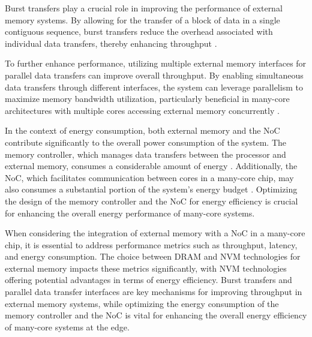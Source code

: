 Burst transfers play a crucial role in improving the performance of external memory systems.
By allowing for the transfer of a block of data in a single contiguous sequence, burst transfers reduce the overhead associated with individual data transfers, thereby enhancing throughput \cite{bakhodaDesigningOnchipNetworks2013}.

To further enhance performance, utilizing multiple external memory interfaces for parallel data transfers can improve overall throughput.
By enabling simultaneous data transfers through different interfaces, the system can leverage parallelism to maximize memory bandwidth utilization, particularly beneficial in many-core architectures with multiple cores accessing external memory concurrently \cite{chenIncreasingOffchipBandwidth2014}.

In the context of energy consumption, both external memory and the NoC contribute significantly to the overall power consumption of the system.
The memory controller, which manages data transfers between the processor and external memory, consumes a considerable amount of energy \cite{udipiRethinkingDRAMDesign2010}.
Additionally, the NoC, which facilitates communication between cores in a many-core chip, may also consumes a substantial portion of the system's energy budget \cite{ziaHighlyscalable3DCLOS2010}.
Optimizing the design of the memory controller and the NoC for energy efficiency is crucial for enhancing the overall energy performance of many-core systems.

When considering the integration of external memory with a NoC in a many-core chip, it is essential to address performance metrics such as throughput, latency, and energy consumption.
The choice between DRAM and NVM technologies for external memory impacts these metrics significantly, with NVM technologies offering potential advantages in terms of energy efficiency.
Burst transfers and parallel data transfer interfaces are key mechanisms for improving throughput in external memory systems, while optimizing the energy consumption of the memory controller and the NoC is vital for enhancing the overall energy efficiency of many-core systems at the edge.
